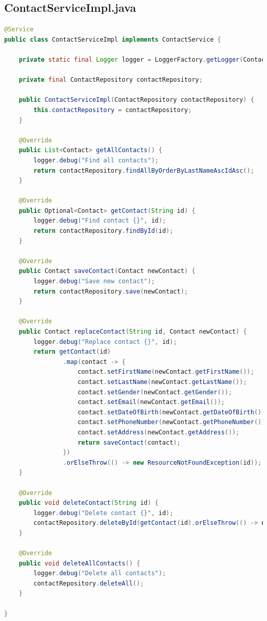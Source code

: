 \clearpage
\subsection*{ContactServiceImpl.java}

\begin{lstlisting}[language=java]
@Service
public class ContactServiceImpl implements ContactService {

    private static final Logger logger = LoggerFactory.getLogger(ContactApplication.class);

    private final ContactRepository contactRepository;

    public ContactServiceImpl(ContactRepository contactRepository) {
        this.contactRepository = contactRepository;
    }

    @Override
    public List<Contact> getAllContacts() {
        logger.debug("Find all contacts");
        return contactRepository.findAllByOrderByLastNameAscIdAsc();
    }

    @Override
    public Optional<Contact> getContact(String id) {
        logger.debug("Find contact {}", id);
        return contactRepository.findById(id);
    }

    @Override
    public Contact saveContact(Contact newContact) {
        logger.debug("Save new contact");
        return contactRepository.save(newContact);
    }

    @Override
    public Contact replaceContact(String id, Contact newContact) {
        logger.debug("Replace contact {}", id);
        return getContact(id)
                .map(contact -> {
                    contact.setFirstName(newContact.getFirstName());
                    contact.setLastName(newContact.getLastName());
                    contact.setGender(newContact.getGender());
                    contact.setEmail(newContact.getEmail());
                    contact.setDateOfBirth(newContact.getDateOfBirth());
                    contact.setPhoneNumber(newContact.getPhoneNumber());
                    contact.setAddress(newContact.getAddress());
                    return saveContact(contact);
                })
                .orElseThrow(() -> new ResourceNotFoundException(id));
    }

    @Override
    public void deleteContact(String id) {
        logger.debug("Delete contact {}", id);
        contactRepository.deleteById(getContact(id).orElseThrow(() -> new ResourceNotFoundException(id)).getId());
    }

    @Override
    public void deleteAllContacts() {
        logger.debug("Delete all contacts");
        contactRepository.deleteAll();
    }

}
\end{lstlisting}

